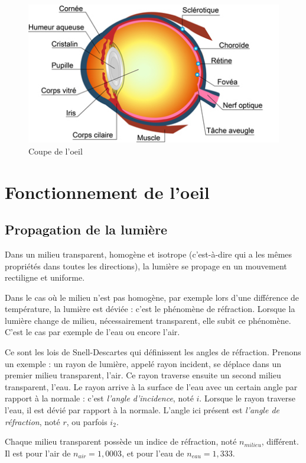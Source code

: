 \documentclass[a4paper, 12pt, onecolumn, openany]{report}
\begin{document}
	\begin{figure}[h]
	\begin{center}
	\includegraphics[scale=0.8]{schema_oeil.jpg}
	\end{center}
	\caption{Coupe de l'oeil}
	\label{Coupe de l'oeil}
	\end{figure}
\newpage
	\section{Fonctionnement de l'oeil}
		\subsection{Propagation de la lumière}
		Dans un milieu transparent, homogène et isotrope (c’est-à-dire qui a les mêmes propriétés dans toutes les directions), la lumière se propage en un mouvement rectiligne et uniforme.
		
	Dans le cas où le milieu n’est pas homogène, par exemple lors d’une différence de température, la lumière est déviée : c'est le phénomène de réfraction. Lorsque la lumière change de milieu, nécessairement transparent, elle subit ce phénomène. C’est le cas par exemple de l’eau ou encore l'air. 
	
	Ce sont les lois de Snell-Descartes qui définissent les angles de réfraction. Prenons un exemple : un rayon de lumière, appelé rayon incident, se déplace dans un premier milieu transparent, l'air. Ce rayon traverse ensuite un second milieu transparent, l'eau. Le rayon arrive à la surface de l'eau avec un certain angle par rapport à la normale : c'est \textit{l'angle d'incidence}, noté $i$. Lorsque le rayon traverse l'eau, il est dévié par rapport à la normale. L'angle ici présent est \textit{l'angle de réfraction}, noté $r$, ou parfois $i_{2}$.
	
	Chaque milieu transparent possède un indice de réfraction, noté $n_{milieu}$, différent. Il est pour l'air de $n_{air} = 1,0003$, et pour l'eau de $n_{eau} = 1,333$.
	
\end{document}
